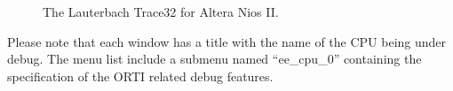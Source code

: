 %
\begin{figure}
\caption{\label{fig:trace32_splash} The Lauterbach Trace32 for Altera
Nios II.}
\end{figure}
%

Please note that each window has a title
with the name of the CPU being under debug. The menu list include a
submenu named ``ee\_cpu\_0'' containing the specification of the ORTI
related debug features.

